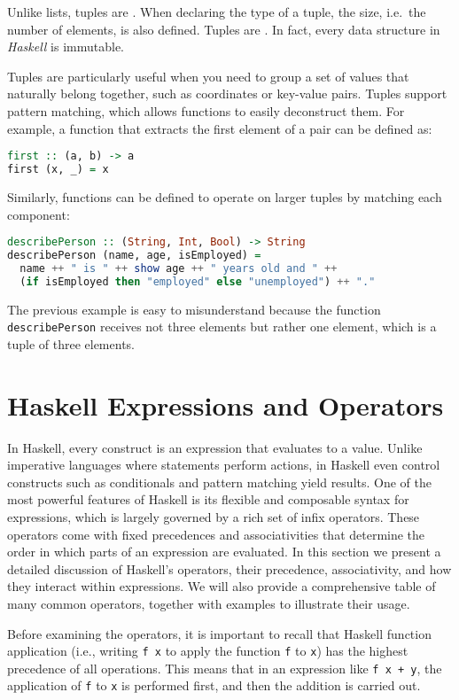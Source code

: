 Unlike lists, tuples are .  When declaring the type of a tuple, the size, i.e.~the number of
elements, is also defined.  Tuples are .  In fact, every data structure in
\textsl{Haskell} is immutable.  

Tuples are particularly useful when you need to group a set of values that
naturally belong together, such as coordinates or key-value pairs. 
Tuples support pattern matching, which allows functions to easily deconstruct them. For example, a function that extracts the first element of a pair can be defined as:
\begin{lstlisting}[style=haskellstyle, language=Haskell]
first :: (a, b) -> a
first (x, _) = x
\end{lstlisting}
Similarly, functions can be defined to operate on larger tuples by matching each component:
\begin{lstlisting}[style=haskellstyle, language=Haskell]
describePerson :: (String, Int, Bool) -> String
describePerson (name, age, isEmployed) =
  name ++ " is " ++ show age ++ " years old and " ++
  (if isEmployed then "employed" else "unemployed") ++ "."
\end{lstlisting}
The previous example is easy to misunderstand because the function \texttt{describePerson} receives not three
elements but rather one element, which is a tuple of three elements.


\section{Haskell Expressions and Operators}
In Haskell, every construct is an expression that evaluates to a value. Unlike imperative languages where
statements perform actions, in Haskell even control constructs such as conditionals and pattern matching yield
results. One of the most powerful features of Haskell is its flexible and composable syntax for expressions,
which is largely governed by a rich set of infix operators. These operators come with fixed precedences and
associativities that determine the order in which parts of an expression are evaluated. In this section we
present a detailed discussion of Haskell’s operators, their precedence, associativity, and how they interact
within expressions. We will also provide a comprehensive table of many common operators, together with examples
to illustrate their usage.  

Before examining the operators, it is important to recall that Haskell function application (i.e., writing
\texttt{f x} to apply the function \texttt{f} to \texttt{x}) has the highest precedence of all operations. This
means that in an expression like \texttt{f x + y}, the application of \texttt{f} to \texttt{x} is performed
first, and then the addition is carried out.

